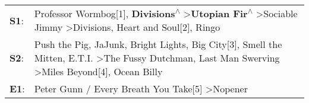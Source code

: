 \begin{supertabular}{p{0.03\textwidth}p{0.92\textwidth}}
 \textbf{S1}:  &                                                        Professor Wormbog[1]\textsuperscript{}, \enspace \textbf{Divisions\textsuperscript{$\wedge$}} \textgreater \enspace \textbf{Utopian Fir\textsuperscript{$\wedge$}} \textgreater \enspace Sociable Jimmy\textsuperscript{} \textgreater \enspace Divisions\textsuperscript{}, \enspace Heart and Soul[2]\textsuperscript{}, \enspace Ringo\textsuperscript{}  \enspace  \\
 \textbf{S2}:  &  Push the Pig\textsuperscript{}, \enspace JaJunk\textsuperscript{}, \enspace Bright Lights, Big City[3]\textsuperscript{}, \enspace Smell the Mitten\textsuperscript{}, \enspace E.T.I.\textsuperscript{} \textgreater \enspace The Fussy Dutchman\textsuperscript{}, \enspace Last Man Swerving\textsuperscript{} \textgreater \enspace Miles Beyond[4]\textsuperscript{}, \enspace Ocean Billy\textsuperscript{}  \enspace  \\
 \textbf{E1}:  &                                                                                                                                                                                                                                                                                                            Peter Gunn / Every Breath You Take[5]\textsuperscript{} \textgreater \enspace Nopener\textsuperscript{}  \enspace  \\
\end{supertabular}
